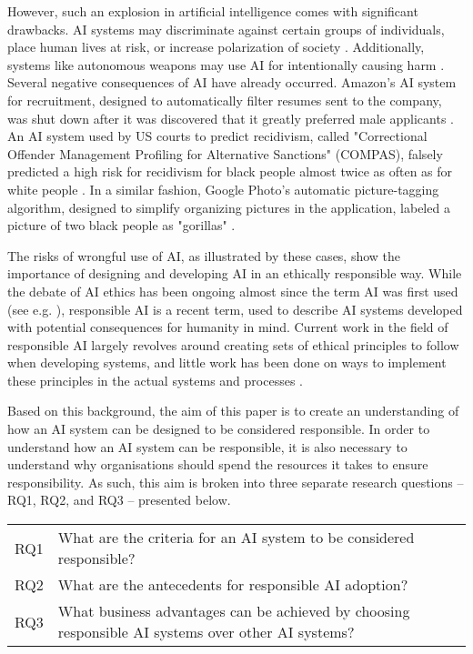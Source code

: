 However, such an explosion in artificial intelligence comes with significant drawbacks. AI systems may discriminate against certain groups of individuals, place human lives at risk, or increase polarization of society \parencite{Mikalef_2022}. Additionally, systems like autonomous weapons may use AI for intentionally causing harm \parencite{Eitel-Porter_2021}. Several negative consequences of AI have already occurred. Amazon's AI system for recruitment, designed to automatically filter resumes sent to the company, was shut down after it was discovered that it greatly preferred male applicants \parencite{Amazon_case_intro}. An AI system used by US courts to predict recidivism, called "Correctional Offender Management Profiling for Alternative Sanctions" (COMPAS), falsely predicted a high risk for recidivism for black people almost twice as often as for white people \parencite{COMPAS_2016_intro}.  In a similar fashion, Google Photo's automatic picture-tagging algorithm, designed to simplify organizing pictures in the application, labeled a picture of two black people as "gorillas" \parencite{Google_case_intro}.

The risks of wrongful use of AI, as illustrated by these cases, show the importance of designing and developing AI in an ethically responsible way. While the debate of AI ethics has been ongoing almost since the term AI was first used (see e.g. \cite{Wiener_1960,Samuel_1960}), responsible AI is a recent term, used to describe AI systems developed with potential consequences for humanity in mind. Current work in the field of responsible AI largely revolves around creating sets of ethical principles to follow when developing systems, and little work has been done on ways to implement these principles in the actual systems and processes \parencite{BarredoArrieta_2020}.

Based on this background, the aim of this paper is to create an understanding of how an AI system can be designed to be considered responsible. In order to understand how an AI system can be responsible, it is also necessary to understand why organisations should spend the resources it takes to ensure responsibility. As such, this aim is broken into three separate research questions -- RQ1, RQ2, and RQ3 -- presented below.

\begin{table}[h]
    \centering
    \begin{tabular}{cp{}}
        RQ1 & What are the criteria for an AI system to be considered responsible? \\
        RQ2 & What are the antecedents for responsible AI adoption? \\
        RQ3 & What business advantages can be achieved by choosing responsible AI systems over other AI systems? \\
    \end{tabular}
\end{table}

